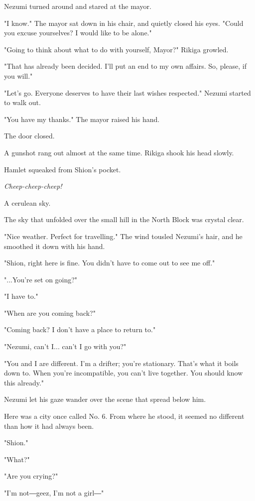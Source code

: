 Nezumi turned around and stared at the mayor.

"I know." The mayor sat down in his chair, and quietly closed his eyes.
"Could you excuse yourselves? I would like to be alone."

"Going to think about what to do with yourself, Mayor?" Rikiga growled.

"That has already been decided. I'll put an end to my own affairs. So,
please, if you will."

"Let's go. Everyone deserves to have their last wishes respected."
Nezumi started to walk out.

"You have my thanks." The mayor raised his hand.

The door closed.

A gunshot rang out almost at the same time. Rikiga shook his head
slowly.

Hamlet squeaked from Shion's pocket.

\emph{Cheep-cheep-cheep!}

\myspace

A cerulean sky.

The sky that unfolded over the small hill in the North Block was crystal
clear.

"Nice weather. Perfect for travelling." The wind tousled Nezumi's hair,
and he smoothed it down with his hand.

"Shion, right here is fine. You didn't have to come out to see me off."

"...You're set on going?"

"I have to."

"When are you coming back?"

"Coming back? I don't have a place to return to."

"Nezumi, can't I... can't I go with you?"

"You and I are different. I'm a drifter; you're stationary. That's what
it boils down to. When you're incompatible, you can't live together. You
should know this already."

Nezumi let his gaze wander over the scene that spread below him.

Here was a city once called No. 6. From where he stood, it seemed no
different than how it had always been.

"Shion."

"What?"

"Are you crying?"

"I'm not―geez, I'm not a girl―"


